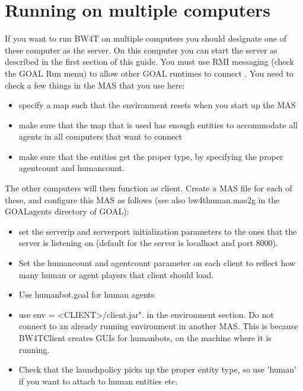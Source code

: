 \documentclass[11pt,a4paper]{article}
\begin{document}
\section{Running on multiple computers}
If you want to run BW4T on multiple computers you should designate one of these computer as the server. On this computer you can start the server as described in the first section of this guide. You must use RMI messaging (check the GOAL Run menu) to allow other GOAL runtimes to connect .
You need to check a few things in the MAS that you use here:
\begin{itemize}
\item specify a map such that the environment resets when you start up the MAS
\item make sure that the map that is used has enough entities to accommodate all agents in all computers that want to connect
\item make sure that the entities get the proper type, by specifying the proper agentcount and humancount.
\end{itemize}
The other computers will then function as client. Create a MAS file for each of these, and configure this MAS as follows (see also bw4thuman.mas2g in the GOALagents directory of GOAL):
\begin{itemize}
\item set the serverip and serverport initialization parameters to the ones that the server is listening on (default for the server is localhost and port 8000).
\item Set the humancount and agentcount parameter on each client to reflect how many human or agent players that client should load.
\item Use humanbot.goal for human agents
\item use env = <CLIENT>/client.jar". in the environment section. Do not connect to an already running environment in another MAS. This is because BW4TClient creates GUIs for humanbots, on the machine where it is running.
\item Check that the launchpolicy picks up the proper entity type, so use 'human' if you want to attach to human entities etc.
\end{itemize} 
\end{document}
